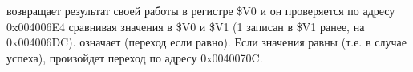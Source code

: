 \scanf возвращает результат своей работы в регистре \$V0 и он проверяется по адресу 0x004006E4
сравнивая значения в \$V0 и \$V1 (1 записан в \$V1 ранее, на 0x004006DC).
 означает  (переход если равно).
Если значения равны (т.е. в случае успеха), произойдет переход по адресу 0x0040070C.


